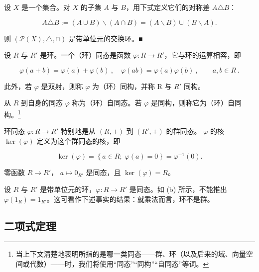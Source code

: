 \begin{example}
\begin{items}
\item

设 $X$ 是一个集合。对 $X$ 的子集 $A$ 与 $B$，用下式定义它们的对称差 $A \triangle B$：

\[
A\triangle B:=(A\cup B)\backslash(A\cap B)=(A\backslash B)\cup(B\backslash A).
\]

则  $ (\mathcal{P}(X), \triangle, \cap) $ 是带单位元的交换环。■

\end{items}

设 $R$ 与 $R'$ 是环。一个（环）同态是函数 $\varphi: R \to R'$，它与环的运算相容，即

\begin{equation}
\varphi(a+b)=\varphi(a)+\varphi(b)~,\quad\varphi(ab)=\varphi(a)\varphi(b)~,\qquad a,b\in R~.
\end{equation}

此外，若  $ \varphi $ 是双射，则称  $ \varphi $ 为（环）同构，并称 R 与  $ R' $ 同构。

从  $ R $ 到自身的同态  $ \varphi $ 称为（环）自同态。若  $ \varphi $ 是同构，则称它为（环）自同构。\footnote{当上下文清楚地表明所指的是哪一类同态——群、环（以及后来的域、向量空间或代数）——时，我们将使用“同态”“同构”“自同态”等词。}

\end{example}

\begin{remark}

\begin{items}
\item

环同态  $ \varphi: R \to R' $ 特别地是从  $ (R, +) $ 到  $ (R', +) $ 的群同态。 $ \varphi $ 的核  $ \ker(\varphi) $ 定义为这个群同态的核，即

\[
\ker(\varphi)=\left\{a\in R;\;\varphi(a)=0\right\}=\varphi^{-1}(0).
\]
\item

零函数  $ R \to R' $， $ a \mapsto 0_{R'} $ 是同态，且  $ \ker(\varphi) = R $。

\item

设 $R$ 与 $R'$ 是带单位元的环，$\varphi: R \to R'$ 是同态。如 (b) 所示，不能推出 $\varphi(1_R) = 1_{R'}$。这可看作下述事实的结果：就乘法而言，环不是群。

\end{items}

\end{remark}

\subsection*{二项式定理}

